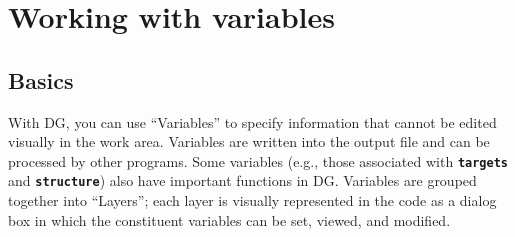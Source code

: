 \documentclass[12pt]{report}
\begin{document}





\chapter{Working with variables}

\section{Basics}

With DG, you can use ``Variables'' to specify information that cannot be
edited visually in the work area. Variables are written into the output
file and can be processed by other programs. Some variables (e.g., those
associated with \textbf{\texttt{targets}}
and \textbf{\texttt{structure}}) 
also have important functions in DG.  Variables are grouped
together into ``Layers''; each layer is visually represented
in the code as a dialog box in which the constituent variables can
be set, viewed, and modified.
\end{document}
